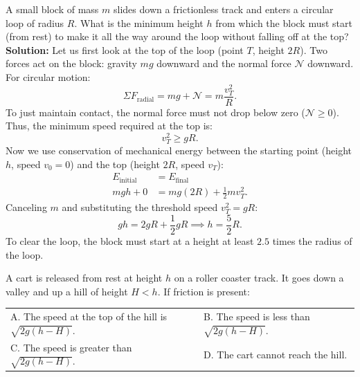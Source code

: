 \begin{workedexample}
A small block of mass $m$ slides down a frictionless track and enters a circular loop of radius $R$. What is the minimum height $h$ from which the block must start (from rest) to make it all the way around the loop without falling off at the top?
\newline
\textbf{Solution:}
Let us first look at the top of the loop (point $T$, height $2R$). Two forces act on the block: gravity $mg$ downward and the normal force $\mathscr{N}$ downward. For circular motion:
\begin{equation*}
    \Sigma F_{\text{radial}} = mg + \mathscr{N} = m \frac{v_T^2}{R}.
\end{equation*}
To just maintain contact, the normal force must not drop below zero ($\mathscr{N} \ge 0$). Thus, the minimum speed required at the top is:
\begin{equation*}
    v_T^2 \ge gR.
\end{equation*}
Now we use conservation of mechanical energy between the starting point (height $h$, speed $v_0 = 0$) and the top (height $2R$, speed $v_T$):
\begin{align*}
    E_{\text{initial}} &= E_{\text{final}} \\
    mgh + 0 &= mg(2R) + \frac{1}{2}m v_T^2.
\end{align*}
Canceling $m$ and substituting the threshold speed $v_T^2 = gR$:
\begin{equation*}
    gh = 2gR + \frac{1}{2}gR \implies h = \frac{5}{2}R.
\end{equation*}
To clear the loop, the block must start at a height at least $2.5$ times the radius of the loop.
\end{workedexample}

\begin{checkpoint}[6.2]
A cart is released from rest at height $h$ on a roller coaster track. It goes down a valley and up a hill of height $H < h$. If friction is present:
\newline
\begin{tabular}{ll}
  A. The speed at the top of the hill is $\sqrt{2g(h-H)}$. & B. The speed is less than $\sqrt{2g(h-H)}$. \\
  C. The speed is greater than $\sqrt{2g(h-H)}$. & D. The cart cannot reach the hill.
\end{tabular}
\end{checkpoint}

